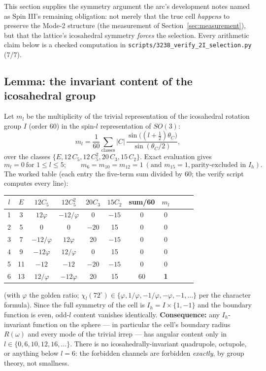 \documentclass[12pt]{article}
\begin{document}
This section supplies the symmetry argument the arc's development notes
named as Spin III's remaining obligation: not merely that the true cell
\emph{happens} to preserve the Mode-2 structure (the measurement of
Section~\ref{sec:measurement}), but that the lattice's icosahedral
symmetry \emph{forces} the selection.  Every arithmetic claim below is
a checked computation in
\texttt{scripts/3238\_verify\_2I\_selection.py} (7/7).

\subsection{Lemma: the invariant content of the icosahedral group}
\label{sec:characters}

Let $m_l$ be the multiplicity of the trivial representation of the
icosahedral rotation group $I$ (order 60) in the spin-$l$
representation of $SO(3)$:
\begin{equation}
m_l = \frac{1}{60}\sum_{\text{classes}} |C|\,
\frac{\sin\!\big((l+\tfrac12)\theta_C\big)}{\sin(\theta_C/2)},
\end{equation}
over the classes $\{E, 12\,C_5, 12\,C_5^2, 20\,C_3, 15\,C_2\}$.  Exact
evaluation gives
\begin{equation}
m_l = 0 \ \text{for } 1 \le l \le 5;\qquad
m_6 = m_{10} = m_{12} = 1 \ (\text{and } m_{15}=1,
\text{parity-excluded in } I_h).
\label{eq:mult}
\end{equation}
The worked table (each entry the five-term sum divided by 60; the
verify script computes every line):
\begin{center}
\begin{tabular}{c|cccccc|c|ccc}
$l$ & $E$ & $12C_5$ & $12C_5^2$ & $20C_3$ & $15C_2$ & sum/60 & $m_l$ &&& \\
\hline
1 & 3 & $12\varphi$ & $-12/\varphi$ & 0 & $-15$ & 0 & 0 &&& \\
2 & 5 & 0 & 0 & $-20$ & 15 & 0 & 0 &&& \\
3 & 7 & $-12/\varphi$ & $12\varphi$ & 20 & $-15$ & 0 & 0 &&& \\
4 & 9 & $-12\varphi$ & $12/\varphi$ & 0 & 15 & 0 & 0 &&& \\
5 & 11 & $-12$ & $-12$ & $-20$ & $-15$ & 0 & 0 &&& \\
6 & 13 & $12/\varphi$ & $-12\varphi$ & 20 & 15 & 60 & \textbf{1} &&& \\
\end{tabular}
\end{center}
(with $\varphi$ the golden ratio; $\chi_l(72^\circ) \in \{ \varphi,
1/\varphi, -1/\varphi, -\varphi, -1, \ldots\}$ per the character
formula).  Since the full symmetry of the cell is $I_h = I \times \{1,
-1\}$ and the boundary function is even, odd-$l$ content vanishes
identically.
\textbf{Consequence:} any $I_h$-invariant function on the sphere --- in
particular the cell's boundary radius $R(\omega)$ and every mode of the
trivial irrep --- has angular content only in $l \in \{0, 6, 10, 12,
16, \ldots\}$.  There is no icosahedrally-invariant quadrupole,
octupole, or anything below $l = 6$: the forbidden channels are
forbidden \emph{exactly}, by group theory, not smallness.
\end{document}
